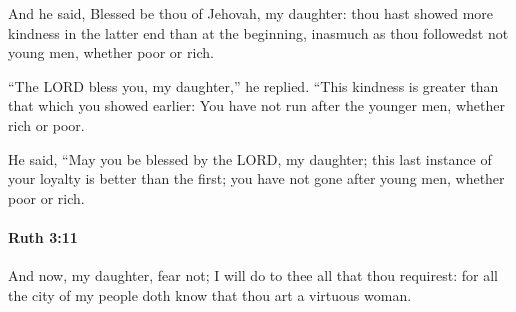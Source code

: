 			\begin{versebox}
					\item[BHS] 
					\item[LXX] 
					\item[ASV] And he said, Blessed be thou of Jehovah, my daughter: thou hast showed more kindness in the latter end than at the beginning, inasmuch as thou followedst not young men, whether poor or rich.
					\item[NIV] “The LORD bless you, my daughter,” he replied. “This kindness is greater than that which you showed earlier: You have not run after the younger men, whether rich or poor.
					\item[NRSV] He said, “May you be blessed by the LORD, my daughter; this last instance of your loyalty is better than the first; you have not gone after young men, whether poor or rich.
			\end{versebox}

		\paragraph{Ruth 3:11} %
			\label{RUTH-3-11}

			And now, my daughter, fear not; I will do to thee all that thou requirest: for all the city of my people doth know that thou art a virtuous woman.

